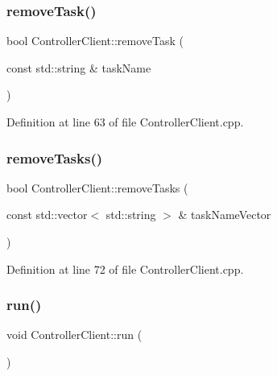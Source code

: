 \subsubsection{\texorpdfstring{remove\+Task()}{removeTask()}}
{\footnotesize\ttfamily bool Controller\+Client\+::remove\+Task (\begin{DoxyParamCaption}\item[{const std\+::string \&}]{task\+Name }\end{DoxyParamCaption})}



Definition at line 63 of file Controller\+Client.\+cpp.

\hypertarget{classocra__recipes_1_1ControllerClient_a7e72d409c511f201201292e8c123e771}{}\label{classocra__recipes_1_1ControllerClient_a7e72d409c511f201201292e8c123e771} 
\subsubsection{\texorpdfstring{remove\+Tasks()}{removeTasks()}}
{\footnotesize\ttfamily bool Controller\+Client\+::remove\+Tasks (\begin{DoxyParamCaption}\item[{const std\+::vector$<$ std\+::string $>$ \&}]{task\+Name\+Vector }\end{DoxyParamCaption})}



Definition at line 72 of file Controller\+Client.\+cpp.

\hypertarget{classocra__recipes_1_1ControllerClient_a4a17a6233a5d824ee58115003b332c18}{}\label{classocra__recipes_1_1ControllerClient_a4a17a6233a5d824ee58115003b332c18} 
\subsubsection{\texorpdfstring{run()}{run()}}
{\footnotesize\ttfamily void Controller\+Client\+::run (\begin{DoxyParamCaption}{ }\end{DoxyParamCaption})\hspace{0.3cm}{\ttfamily [virtual]}}



